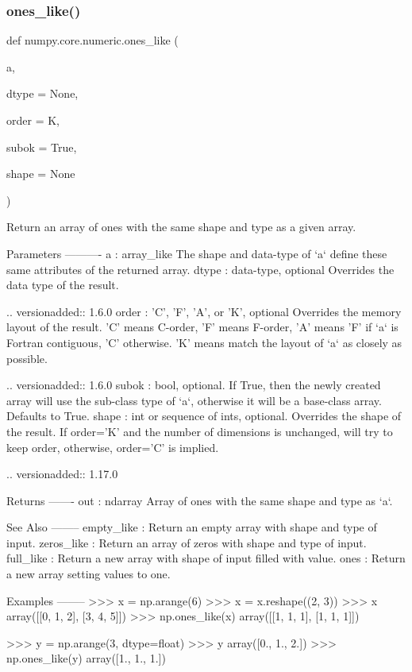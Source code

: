 \subsubsection{\texorpdfstring{ones\+\_\+like()}{ones\_like()}}
{\footnotesize\ttfamily def numpy.\+core.\+numeric.\+ones\+\_\+like (\begin{DoxyParamCaption}\item[{}]{a,  }\item[{}]{dtype = {\ttfamily None},  }\item[{}]{order = {\ttfamily \textquotesingle{}K\textquotesingle{}},  }\item[{}]{subok = {\ttfamily True},  }\item[{}]{shape = {\ttfamily None} }\end{DoxyParamCaption})}

\begin{DoxyVerb}Return an array of ones with the same shape and type as a given array.

Parameters
----------
a : array_like
    The shape and data-type of `a` define these same attributes of
    the returned array.
dtype : data-type, optional
    Overrides the data type of the result.

    .. versionadded:: 1.6.0
order : {'C', 'F', 'A', or 'K'}, optional
    Overrides the memory layout of the result. 'C' means C-order,
    'F' means F-order, 'A' means 'F' if `a` is Fortran contiguous,
    'C' otherwise. 'K' means match the layout of `a` as closely
    as possible.

    .. versionadded:: 1.6.0
subok : bool, optional.
    If True, then the newly created array will use the sub-class
    type of `a`, otherwise it will be a base-class array. Defaults
    to True.
shape : int or sequence of ints, optional.
    Overrides the shape of the result. If order='K' and the number of
    dimensions is unchanged, will try to keep order, otherwise,
    order='C' is implied.

    .. versionadded:: 1.17.0

Returns
-------
out : ndarray
    Array of ones with the same shape and type as `a`.

See Also
--------
empty_like : Return an empty array with shape and type of input.
zeros_like : Return an array of zeros with shape and type of input.
full_like : Return a new array with shape of input filled with value.
ones : Return a new array setting values to one.

Examples
--------
>>> x = np.arange(6)
>>> x = x.reshape((2, 3))
>>> x
array([[0, 1, 2],
       [3, 4, 5]])
>>> np.ones_like(x)
array([[1, 1, 1],
       [1, 1, 1]])

>>> y = np.arange(3, dtype=float)
>>> y
array([0., 1., 2.])
>>> np.ones_like(y)
array([1.,  1.,  1.])\end{DoxyVerb}
 \mbox{\label{namespacenumpy_1_1core_1_1numeric_acb46476790d894e402755264dfc69ffb}} 
